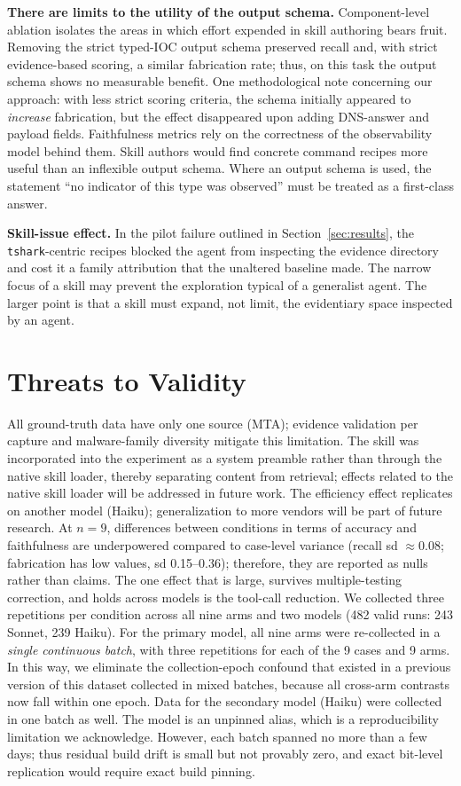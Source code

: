 \documentclass[conference]{IEEEtran}
\newcommand{\num}[1]{#1} %
\begin{document}
\textbf{There are limits to the utility of the output schema.} Component-level ablation
isolates the areas in which effort expended in skill authoring bears fruit. Removing the
strict typed-IOC output schema preserved recall and, with strict evidence-based scoring, a
similar fabrication rate; thus, on this task the output schema shows no measurable benefit.
One methodological note concerning our approach: with less strict scoring criteria, the
schema initially appeared to \emph{increase} fabrication, but the effect disappeared upon
adding DNS-answer and payload fields. Faithfulness metrics rely on the correctness of the
observability model behind them. Skill authors would find concrete command recipes more
useful than an inflexible output schema. Where an output schema is used, the statement ``no
indicator of this type was observed'' must be treated as a first-class answer.

\textbf{Skill-issue effect.} In the pilot failure outlined in Section~\ref{sec:results}, the
\texttt{tshark}-centric recipes blocked the agent from inspecting the evidence directory and
cost it a family attribution that the unaltered baseline made. The narrow focus of a skill
may prevent the exploration typical of a generalist agent. The larger point is that a skill
must expand, not limit, the evidentiary space inspected by an agent.

\section{Threats to Validity}\label{sec:threats}
All ground-truth data have only one source (MTA); evidence validation per capture and
malware-family diversity mitigate this limitation. The skill was incorporated into the
experiment as a system preamble rather than through the native skill loader, thereby
separating content from retrieval; effects related to the native skill loader will be
addressed in future work. The efficiency effect replicates on another model (Haiku);
generalization to more vendors will be part of future research. At $n{=}9$, differences
between conditions in terms of accuracy and faithfulness are underpowered compared to
case-level variance (recall sd $\approx$\num{0.08}; fabrication has low values, sd
\num{0.15}--\num{0.36}); therefore, they are reported as nulls rather than claims. The one
effect that is large, survives multiple-testing correction, and holds across models is the
tool-call reduction. We collected three repetitions per condition across all nine arms and
two models (\num{482} valid runs: \num{243} Sonnet, \num{239} Haiku). For the primary model,
all nine arms were re-collected in a \emph{single continuous batch}, with three repetitions
for each of the \num{9} cases and \num{9} arms. In this way, we eliminate the
collection-epoch confound that existed in a previous version of this dataset collected in
mixed batches, because all cross-arm contrasts now fall within one epoch. Data for the
secondary model (Haiku) were collected in one batch as well. The model is an unpinned alias,
which is a reproducibility limitation we acknowledge. However, each batch spanned no more
than a few days; thus residual build drift is small but not provably zero, and exact
bit-level replication would require exact build pinning.
\end{document}
